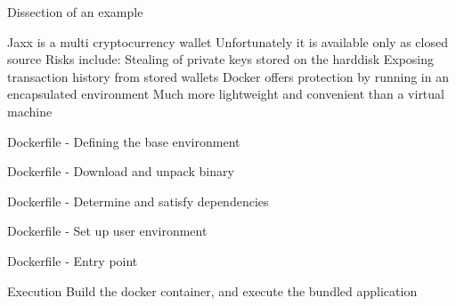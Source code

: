 \documentclass[11pt, aspectratio=169]{beamer}
\begin{document}
\begin{frame}{Dissection of an example}
\begin{outline}
\1 Jaxx is a multi cryptocurrency wallet
\1 Unfortunately it is available only as closed source
\1 Risks include:
  \2 Stealing of private keys stored on the harddisk
  \2 Exposing transaction history from stored wallets
\1 Docker offers protection by running in an encapsulated environment
\1 Much more lightweight and convenient than a virtual machine
\end{outline}
\end{frame}

\begin{frame}{Dockerfile - Defining the base environment} 

\end{frame}

\begin{frame}{Dockerfile - Download and unpack binary} 

\end{frame}

\begin{frame}{Dockerfile - Determine and satisfy dependencies} 

\end{frame}

\begin{frame}{Dockerfile - Set up user environment} 

\end{frame}

\begin{frame}{Dockerfile - Entry point} 

\end{frame}

\begin{frame}{Execution} 
Build the docker container, and execute the bundled application

\end{frame}
\end{document}
